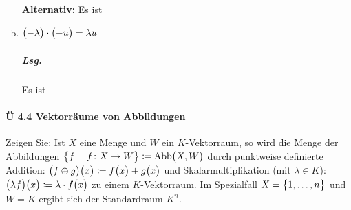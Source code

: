 \documentclass{scrreprt}
\begin{document}
\begin{enumerate}[(a)]
  \textbf{Alternativ:}
  Es ist

\item $\qty\big(-\lambda) \cdot \qty\big(-u) = \lambda u$

  \subparagraph{Lsg.} Es ist
\end{enumerate}

\paragraph{Ü 4.4 Vektorräume von Abbildungen}

Zeigen Sie: Ist $X$ eine Menge und $W$ ein $K$-Vektorraum, so wird die Menge der
Abbildungen
$\qty\big{f \:\mid\: f \colon X \to W} \coloneqq \text{Abb}\qty\big(X, W)$ durch
punktweise definierte Addition:
$\qty\big(f \oplus g)\qty\big(x) \coloneqq f\qty\big(x) + g\qty\big(x)$ und
Skalarmultiplikation (mit $\lambda \in K$):
$\qty\big(\lambda f)\qty\big(x) \coloneqq \lambda \cdot f\qty\big(x)$
zu einem $K$-Vektorraum.
Im Spezialfall $X = \qty\big{1, \ldots, n}$ und $W = K$ ergibt sich der
Standardraum $K^n$.
\end{document}

